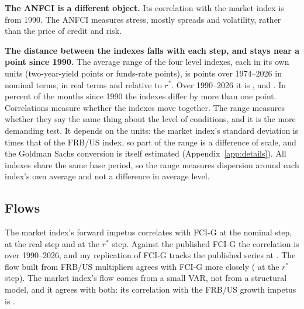 \documentclass[11pt]{article}
\newcommand{\rs}{r^{*}}
\begin{document}
\begin{appendices}
\textbf{The ANFCI is a different object.} Its correlation with the market index is  from 1990. The ANFCI measures stress, mostly spreads and volatility, rather than the price of credit and risk.

\textbf{The distance between the indexes falls with each step, and stays near a point since 1990.} The average range of the four level indexes, each in its own units (two-year-yield points or funds-rate points), is  points over 1974--2026 in nominal terms,  in real terms and  relative to $\rs$. Over 1990--2026 it is ,  and . In  percent of the months since 1990 the indexes differ by more than one point. Correlations measure whether the indexes move together. The range measures whether they say the same thing about the level of conditions, and it is the more demanding test. It depends on the units: the market index's standard deviation is  times that of the FRB/US index, so part of the range is a difference of scale, and the Goldman Sachs conversion is itself estimated (Appendix~\ref{app:details}). All indexes share the same base period, so the range measures dispersion around each index's own average and not a difference in average level.

\subsection{Flows}\label{sec:flows}
The market index's forward impetus correlates  with FCI-G at the nominal step,  at the real step and  at the $\rs$ step. Against the published FCI-G the correlation is  over 1990--2026, and my replication of FCI-G tracks the published series at . The flow built from FRB/US multipliers agrees with FCI-G more closely ( at the $\rs$ step). The market index's flow comes from a small VAR, not from a structural model, and it agrees with both: its correlation with the FRB/US growth impetus is .


\end{appendices}
\end{document}
